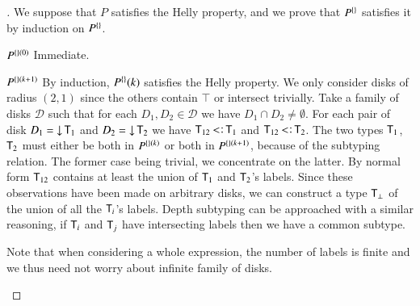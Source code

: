 \documentclass{report}
\begin{document}
  \begin{proof}[]
    We suppose that $P$ satisfies the Helly property, and we prove that $P^{\{\}}$
    satisfies it by induction on $P^{\{\}}$.
    \begin{indcase}{$P^{{\{\}}(0)}$}
      Immediate.
    \end{indcase}
    \begin{indcase}{$P^{{\{\}}(k+1)}$}
      By induction, $P^{\{\}}(k)$ satisfies the Helly property.
      We only consider disks of radius $(2,1)$ since the others contain $\top$ or intersect trivially.
      Take a family of disks
      $\mathcal{D}$ such that for each $D_1,D_2\in\mathcal{D}$ we have $D_1\cap D_2\neq\emptyset$.
      For each pair of disk $D_1=\mathop{\rm\downarrow}\nolimits\textsf{T}_1$ and $D_2=\mathop{\rm\downarrow}\nolimits\textsf{T}_2$ we
      have $\type{T}_{12}\subtype\type{T}_1$ and $\type{T}_{12}\subtype\type{T}_2$. The two types
      $\textsf{T}_1$, $\textsf{T}_2$ must either be both in $P^{{\{\}}(k)}$ or both in $P^{{\{\}}(k+1)}$,
      because of the subtyping relation. The former case being trivial, we concentrate on the latter.
      By normal form  $\textsf{T}_{12}$ contains at least the union of
      $\textsf{T}_{1}$ and $\textsf{T}_{2}$'s labels. Since these observations have been made on arbitrary
      disks, we can construct a type $\textsf{T}_\bot$ of the union of all the $\textsf{T}_i$'s labels.
      Depth subtyping can be approached with a similar reasoning, if $\textsf{T}_i$ and $\textsf{T}_j$
      have intersecting labels then we have a common subtype.
      
      Note that when considering a whole expression, the number of labels is finite
      and we thus need not worry about infinite family of disks.
    \end{indcase}
  \end{proof}
  
\end{document}
